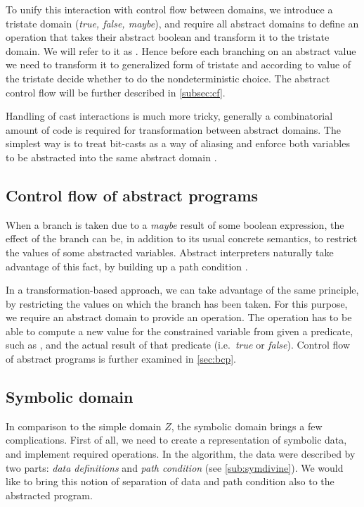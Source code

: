 To unify this interaction with control flow between domains, we introduce a
tristate domain (\emph{true, false, maybe}), and require all abstract domains to
define an operation that takes their abstract boolean and transform it to the
tristate domain. We will refer to it as .  Hence before
each branching on an abstract value we need to transform it to generalized form
of tristate and according to value of the tristate decide whether to do the
nondeterministic choice. The abstract control flow will be further
described in \autoref{subsec:cf}.

Handling of cast interactions is much more tricky, generally a combinatorial
amount of code is required for transformation between abstract domains. The
simplest way is to treat bit-casts as a way of aliasing and enforce both
variables to be abstracted into the same abstract domain \cite{Rockai15}.


\subsection{Control flow of abstract programs} \label{subsec:cf}
When a branch is taken due to a \emph{maybe} result of some boolean expression,
the effect of the branch can be, in addition to its usual concrete semantics,
to restrict the values of some abstracted variables. Abstract interpreters
naturally take advantage of this fact, by building up a path condition
\cite{Rockai15}.

In a transformation-based approach, we can take advantage of the same principle, by
restricting the values on which the branch has been taken. For this purpose, we
require an abstract domain to provide an  operation. The
 operation has to be able to compute a new value for the constrained
variable from given a \LLVM predicate, such as , and the actual result of
that predicate (i.e.~\emph{true} or \emph{false}). Control flow of abstract
programs is further examined in \autoref{sec:bcp}.

\subsection{Symbolic domain}\label{sec:sym}

In comparison to the simple domain $Z$, the symbolic domain brings a few
complications. First of all, we need to create a representation of symbolic
data, and implement required operations. In the \SymDIVINE algorithm, the data were
described by two parts: \emph{data definitions} and \emph{path condition} (see
\autoref{sub:symdivine}). We would like to bring this notion of separation of
data and path condition also to the abstracted program.

